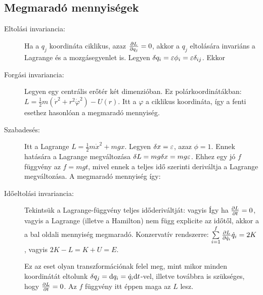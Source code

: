    
   \subsection{Megmaradó mennyiségek}
   
   \begin{description}
    \item[Eltolási invariancia:] Ha a $q_j$ koordináta ciklikus, azaz $\frac{\partial L}{\partial q_j}=0$, akkor a $q_j$ eltolására invariáns a Lagrange és a mozgásegyenlet is. Legyen $\delta q_i=\varepsilon \phi_i=\varepsilon\delta_{ij}$. Ekkor
    \item[Forgási invariancia:] Legyen egy centrális erőtér két dimenzióban. Ez polárkoordinátákban: $L=\frac{1}{2}m(\dot{r}^2+r^2\dot{\varphi}^2)-U(r)$. Itt a $\varphi$ a ciklikus koordináta, így a fenti esethez hasonlóan a
    megmaradó mennyiség. 
    \item[Szabadesés:] Itt a Lagrange $L=\frac{1}{2}m\dot{x}^2+mgx$. Legyen $\delta x=\varepsilon$, azaz $\phi=1$. Ennek hatására a Lagrange megváltozása $\delta L=mg\delta x=mg\varepsilon$. Ehhez egy jó $f$ függvény az $f=mgt$, mivel ennek a teljes idő szerinti deriváltja a Lagrange megváltozása. A megmaradó mennyiség így:
    \item[Időeltolási invariancia:] 
    Tekintsük a Lagrange-függvény teljes időderiváltját:
    vagyis
    Így ha $\frac{\partial L}{\partial t}=0$, vagyis a Lagrange (illetve a Hamilton) nem függ explicite az időtől, akkor a a bal oldali mennyiség megmaradó. Konzervatív rendszerre: $\sum\limits_{i=1}^{f}\frac{\partial L}{\partial \dot{q}_i}\dot{q}_i=2 K$, vagyis $2K-L=K+U=E$.
    
    Ez az eset olyan transzformációnak felel meg, mint mikor minden koordinátát eltolunk $\delta q_j=\mathrm{d} q_i=\dot{q}_i\mathrm{d} t$-vel, illetve továbbra is szükséges, hogy  $\frac{\partial L}{\partial t}=0$. Az $f$ függvény itt éppen maga az $L$ lesz.
   \end{description}
   
